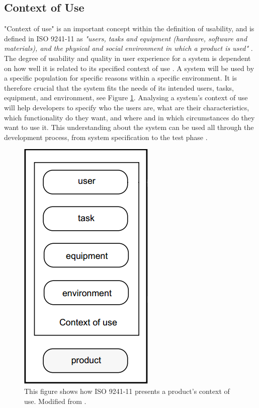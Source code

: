 \subsection{Context of Use}
"Context of use" is an important concept within the definition of usability, and is defined in ISO 9241-11 as \emph{"users, tasks and equipment (hardware, software and materials), and the physical and social environment in which a product is used"} \cite{maguire2001context}. The degree of usability and quality in user experience for a system is dependent on how well it is related to its specified context of use \cite{bevan1995human}. A system will be used by a specific population for specific reasons within a specific environment. It is therefore crucial that the system fits the needs of its intended users, tasks, equipment, and environment, see Figure \ref{contextofuse}. Analysing a system's context of use will help developers to specify who the users are, what are their characteristics, which functionality do they want, and where and in which circumstances do they want to use it. This understanding about the system can be used all through the development process, from system specification to the test phase \cite{maguire2001context}.

\begin{figure} [ht!]
\centering
\includegraphics[scale=0.5]{contextOfUse.jpg}
\caption[Context of use]{This figure shows how ISO 9241-11 presents a product's context of use. Modified from \cite{bevan1995human}.}
\label{contextofuse}
\end{figure} 

